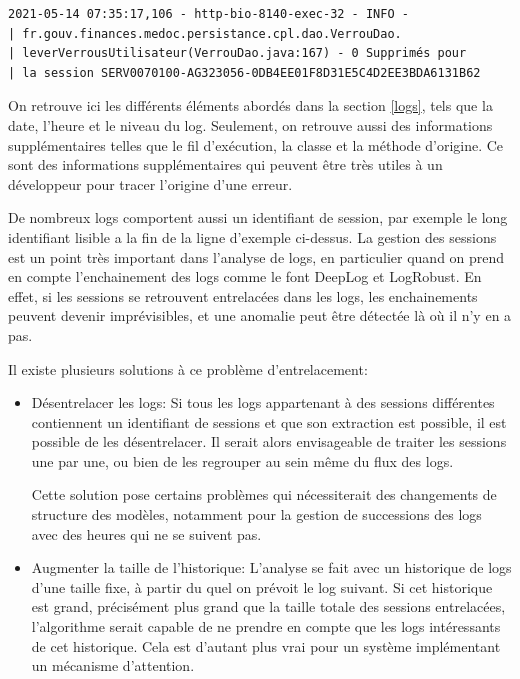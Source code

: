 \documentclass[openany, 11pt]{memoir}
\begin{document}
\begin{lstlisting}
2021-05-14 07:35:17,106 - http-bio-8140-exec-32 - INFO -
| fr.gouv.finances.medoc.persistance.cpl.dao.VerrouDao.
| leverVerrousUtilisateur(VerrouDao.java:167) - 0 Supprimés pour
| la session SERV0070100-AG323056-0DB4EE01F8D31E5C4D2EE3BDA6131B62
\end{lstlisting}

On retrouve ici les différents éléments abordés dans la section \ref{logs}, tels que la date, l'heure et le niveau du \gls{log}. Seulement, on retrouve aussi des informations supplémentaires telles que le fil d'exécution, la classe et la méthode d'origine. Ce sont des informations supplémentaires qui peuvent être très utiles à un développeur pour tracer l'origine d'une erreur.

\bigskip
De nombreux \glspl{log} comportent aussi un identifiant de session, par exemple le long identifiant lisible a la fin de la ligne d'exemple ci-dessus. La gestion des sessions est un point très important dans l'analyse de \glspl{log}, en particulier quand on prend en compte l'enchainement des \glspl{log} comme le font DeepLog et LogRobust. En effet, si les sessions se retrouvent entrelacées dans les \glspl{log}, les enchainements peuvent devenir imprévisibles, et une anomalie peut être détectée là où il n'y en a pas.

Il existe plusieurs solutions à ce problème d'entrelacement:
\begin{itemize}
	\item Désentrelacer les \glspl{log}: Si tous les \glspl{log} appartenant à des sessions différentes contiennent un identifiant de sessions et que son extraction est possible, il est possible de les désentrelacer. Il serait alors envisageable de traiter les sessions une par une, ou bien de les regrouper au sein même du flux des \glspl{log}.

Cette solution pose certains problèmes qui nécessiterait des changements de structure des modèles, notamment pour la gestion de successions des \glspl{log} avec des heures qui ne se suivent pas.

	\item Augmenter la taille de l'historique: L'analyse se fait avec un historique de \glspl{log} d'une taille fixe, à partir du quel on prévoit le log suivant. Si cet historique est grand, précisément plus grand que la taille totale des sessions entrelacées, l'algorithme serait capable de ne prendre en compte que les \glspl{log} intéressants de cet historique. Cela est d'autant plus vrai pour un système implémentant un mécanisme d'attention.
\end{itemize}
\end{document}
